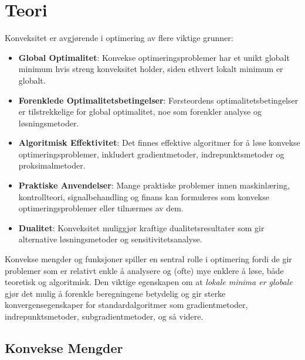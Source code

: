 \chapter{Teori}
\label{chap:konveks_teori}

Konveksitet er avgjørende i optimering av flere viktige grunner:

\begin{itemize}
	\item \textbf{Global Optimalitet}: Konvekse optimeringsproblemer har et unikt globalt minimum hvis streng konveksitet holder, siden ethvert lokalt minimum er globalt.

	\item \textbf{Forenklede Optimalitetsbetingelser}: Førsteordens optimalitetsbetingelser er tilstrekkelige for global optimalitet, noe som forenkler analyse og løsningsmetoder.

	\item \textbf{Algoritmisk Effektivitet}: Det finnes effektive algoritmer for å løse konvekse optimeringsproblemer, inkludert gradientmetoder, indrepunktsmetoder og proksimalmetoder.

	\item \textbf{Praktiske Anvendelser}: Mange praktiske problemer innen maskinlæring, kontrollteori, signalbehandling og finans kan formuleres som konvekse optimeringsproblemer eller tilnærmes av dem.

	\item \textbf{Dualitet}: Konveksitet muliggjør kraftige dualitetsresultater som gir alternative løsningsmetoder og sensitivitetsanalyse.
\end{itemize}

Konvekse mengder og funksjoner spiller en sentral rolle i optimering fordi de gir problemer som er relativt enkle å analysere og (ofte) mye enklere å løse, både teoretisk og algoritmisk.
Den viktige egenskapen om at \emph{lokale minima er globale} gjør det mulig å forenkle beregningene betydelig og gir sterke konvergensegenskaper for standardalgoritmer som gradientmetoder, indrepunktsmetoder, subgradientmetoder, og så videre.

\section{Konvekse Mengder}

